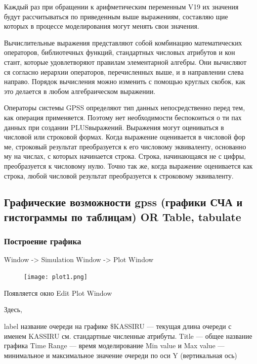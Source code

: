 \documentclass[14pt]{extarticle}
\begin{document}
Каждый раз при обращении к арифметическим переменным V19 их значения будут рассчитываться по приведенным выше выражениям, составляю щие которых в процессе моделирования могут менять свои значения.

Вычислительные выражения представляют собой комбинацию математических операторов, библиотечных функций, стандартных числовых атрибутов и кон стант, которые удовлетворяют правилам элементарной алгебры. Они вычисляют ся согласно иерархии операторов, перечисленных выше, и в направлении слева направо. Порядок вычисления можно изменить с помощью круглых скобок, как это делается в любом алгебраическом выражении.

Операторы системы GPSS определяют тип данных непосредственно перед тем, как операция применяется. Поэтому нет необходимости беспокоиться о ти пах данных при создании PLUSвыражений. Выражения могут оцениваться в числовой или строковой формах. Когда выражение оценивается в числовой фор ме, строковый результат преобразуется к его числовому эквиваленту, основанно му на числах, с которых начинается строка. Строка, начинающаяся не с цифры, преобразуется к числовому нулю. Точно так же, когда выражение оценивается как строка, любой числовой результат преобразуется к строковому эквиваленту.

\subsection*{Графические возможности gpss (графики СЧА и гистограммы по таблицам) OR Table, tabulate}

\subsubsection*{Построение графика}

Window -> Simulation Window -> Plot Window

\begin{figure}[h!]
    \centering
    \texttt{[image: plot1.png]}
\end{figure}

Появляется окно Edit Plot Window

Здесь,

label название очереди на графике
\$KASSIRU — текущая длина очереди с именем KASSIRU см. стандартные численные атрибуты.
Title — общее название графика
Time Range — время моделирование
Min value и Max value — минимальное и максимальное значение очереди по оси Y (вертикальная ось)

\newpage
\end{document}
